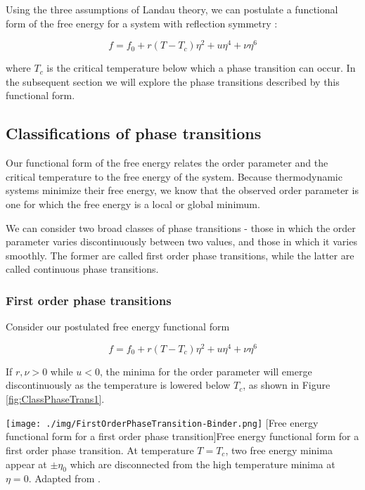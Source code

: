 Using the three assumptions of Landau theory, we can postulate a functional form of the free energy for a system with reflection symmetry \cite{Binder1987}:

\begin{equation}
f = f_{0} + r(T-T_{c}) \eta^{2} + u \eta^{4} + \nu \eta^{6}
\end{equation}

where $T_{c}$ is the critical temperature below which a phase transition can occur. In the subsequent section we will explore the phase transitions described by this functional form.

\subsection{Classifications of phase transitions}

Our functional form of the free energy relates the order parameter and the critical temperature to the free energy of the system. Because thermodynamic systems minimize their free energy, we know that the observed order parameter is one for which the free energy is a local or global minimum.

We can consider two broad classes of phase transitions - those in which the order parameter varies discontinuously between two values, and those in which it varies smoothly. The former are called first order phase transitions, while the latter are called continuous phase transitions.

\subsubsection{First order phase transitions}

Consider our postulated free energy functional form

\begin{equation}
f = f_{0} + r(T-T_{c}) \eta^{2} + u \eta^{4} + \nu \eta^{6}
\end{equation}

If $r,\nu > 0$ while $u < 0$, the minima for the order parameter will emerge discontinuously as the temperature is lowered below $T_{c}$, as shown in Figure \ref{fig:ClassPhaseTrans1}.

\begin{centering}
\texttt{[image: ./img/FirstOrderPhaseTransition-Binder.png]}
  \captionsetup{width=0.9\textwidth}
  [Free energy functional form for a first order phase transition]{Free energy functional form for a first order phase transition. At temperature  $T = T_{c}$, two free energy minima appear at $\pm \eta_{0}$ which are disconnected from the high temperature minima at $\eta = 0$.  Adapted from \cite{Binder1987}.}
  \label{fig:ClassPhaseTrans1}
\end{centering}

